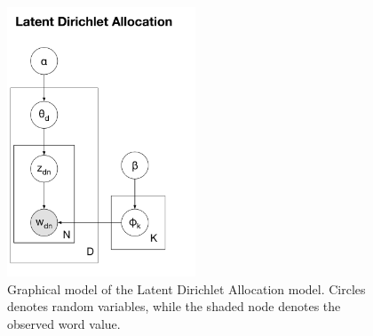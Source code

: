 \begin{figure}[tbh!]
\noindent \begin{centering}
\includegraphics[width=0.5\textwidth]{03-machine-learning/figures/lda.pdf}
\par\end{centering}
\caption{\label{fig:background-lda}Graphical model of the Latent Dirichlet Allocation model. Circles denotes random variables, while the shaded node denotes the observed word value.}
\end{figure}


